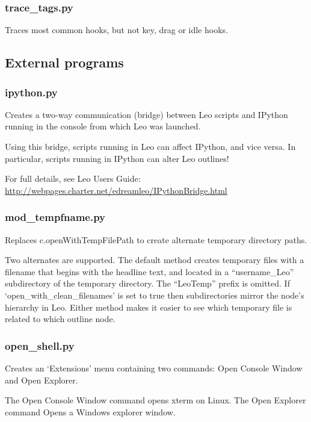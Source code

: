 \documentclass[a4paper,10pt,english]{sphinxmanual}
\begin{document}
\subsubsection{trace\_tags.py}
\label{plugins:trace-tags-py}
Traces most common hooks, but not key, drag or idle hooks.


\subsection{External programs}
\label{plugins:external-programs}

\subsubsection{ipython.py}
\label{plugins:ipython-py}
Creates a two-way communication (bridge) between Leo
scripts and IPython running in the console from which Leo was launched.

Using this bridge, scripts running in Leo can affect IPython, and vice versa.
In particular, scripts running in IPython can alter Leo outlines!

For full details, see Leo Users Guide:
\href{http://webpages.charter.net/edreamleo/IPythonBridge.html}{http://webpages.charter.net/edreamleo/IPythonBridge.html}


\subsubsection{mod\_tempfname.py}
\label{plugins:mod-tempfname-py}
Replaces c.openWithTempFilePath to create alternate temporary
directory paths.

Two alternates are supported. The default method creates temporary files with a
filename that begins with the headline text, and located in a ``username\_Leo''
subdirectory of the temporary directory. The ``LeoTemp'' prefix is omitted. If
`open\_with\_clean\_filenames' is set to true then subdirectories mirror the node's
hierarchy in Leo. Either method makes it easier to see which temporary file is
related to which outline node.


\subsubsection{open\_shell.py}
\label{plugins:open-shell-py}
Creates an `Extensions' menu containing two commands:
Open Console Window and Open Explorer.

The Open Console Window command opens xterm on Linux.
The Open Explorer command Opens a Windows explorer window.
\end{document}
